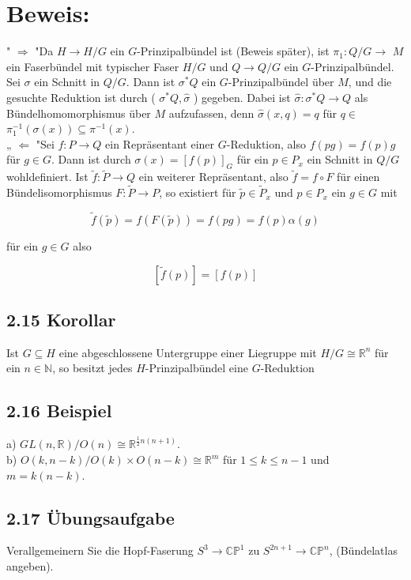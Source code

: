 \section*{Beweis:}
" $\Rightarrow$ "Da $H \rightarrow H / G$ ein $G$-Prinzipalbündel ist (Beweis später), ist $\pi_{1}: Q / G \rightarrow$ $M$ ein Faserbündel mit typischer Faser $H / G$ und $Q \rightarrow Q / G$ ein $G$-Prinzipalbündel. Sei $\sigma$ ein Schnitt in $Q / G$. Dann ist $\sigma^{*} Q$ ein $G$-Prinzipalbündel über $M$, und die gesuchte Reduktion ist durch ( $\sigma^{*} Q, \hat{\sigma}$ ) gegeben. Dabei ist $\hat{\sigma}: \sigma^{*} Q \rightarrow Q$ als Bündelhomomorphismus über $M$ aufzufassen, denn $\hat{\sigma}(x, q)=q$ für $q \in$ $\pi_{1}^{-1}(\sigma(x)) \subseteq \pi^{-1}(x)$.\\
„ $\Leftarrow$ "Sei $f: P \rightarrow Q$ ein Repräsentant einer $G$-Reduktion, also $f(p g)=f(p) g$ für $g \in G$. Dann ist durch $\sigma(x)=[f(p)]_{G}$ für ein $p \in P_{x}$ ein Schnitt in $Q / G$ wohldefiniert. Ist $\tilde{f}: \tilde{P} \rightarrow Q$ ein weiterer Repräsentant, also $\tilde{f}=f \circ F$ für einen Bündelisomorphismus $F: \tilde{P} \rightarrow P$, so existiert für $\tilde{p} \in \tilde{P}_{x}$ und $p \in P_{x}$ ein $g \in G$ mit

$$
\tilde{f}(\tilde{p})=f(F(\tilde{p}))=f(p g)=f(p) \alpha(g)
$$

für ein $g \in G$ also

$$
[\tilde{f}(p)]=[f(p)]
$$

\subsection*{2.15 Korollar}
Ist $G \subseteq H$ eine abgeschlossene Untergruppe einer Liegruppe mit $H / G \cong \mathbb{R}^{n}$ für ein $n \in \mathbb{N}$, so besitzt jedes $H$-Prinzipalbündel eine $G$-Reduktion

\subsection*{2.16 Beispiel}
a) $G L(n, \mathbb{R}) / O(n) \cong \mathbb{R}^{\frac{1}{2} n(n+1)}$.\\
b) $O(k, n-k) / O(k) \times O(n-k) \cong \mathbb{R}^{m}$ für $1 \leq k \leq n-1$ und $m=k(n-k)$.

\subsection*{2.17 Übungsaufgabe}
Verallgemeinern Sie die Hopf-Faserung $S^{3} \rightarrow \mathbb{C P}^{1}$ zu $S^{2 n+1} \rightarrow \mathbb{C} \mathbb{P}^{n}$, (Bündelatlas angeben).


